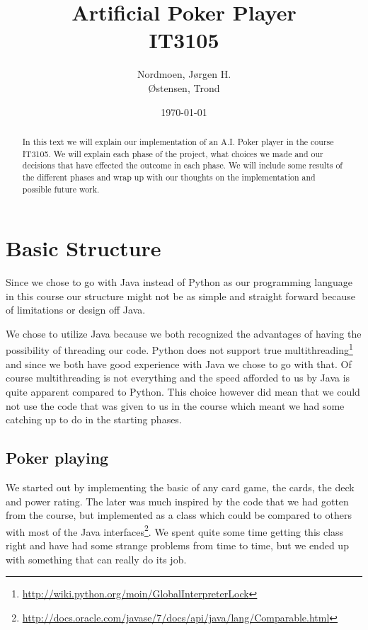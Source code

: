 \documentclass[titlepage, a4paper]{article}
\title{
	Artificial Poker Player \\
	IT3105 \\
}
\author{
	Nordmoen, Jørgen H. \\
	Østensen, Trond
}
\date{\today}
\begin{document}
\maketitle

\begin{abstract}\label{abstract}
In this text we will explain our implementation of an A.I. Poker player in the course
IT3105. We will explain each phase of the project, what choices we made and our decisions
that have effected the outcome in each phase. We will include some results of the different
phases and wrap up with our thoughts on the implementation and possible future work.
\end{abstract}

\newpage
\tableofcontents


\section{Basic Structure}\label{basic}
Since we chose to go with Java instead of Python as our programming language in this course
our structure might not be as simple and straight forward because of limitations or design
off Java.

We chose to utilize Java because we both recognized the advantages of having the possibility
of threading our code. Python does not support true multithreading\footnote{\url{http://wiki.python.org/moin/GlobalInterpreterLock}} and since we both have good experience with Java we chose to go with that.
Of course multithreading is not everything and the speed afforded to us by Java is quite
apparent compared to Python. This choice however did mean that we could not use the code that
was given to us in the course which meant we had some catching up to do in the starting phases.

\subsection{Poker playing}\label{poker playing}
We started out by implementing the basic of any card game, the cards, the deck and power rating.
The later was much inspired by the code that we had gotten from the course, but implemented as
a class which could be compared to others with most of the Java interfaces\footnote{\url{http://docs.oracle.com/javase/7/docs/api/java/lang/Comparable.html}}. We spent quite
some time getting this class right and have had some strange problems from time to time, but
we ended up with something that can really do its job. 
\end{document}
